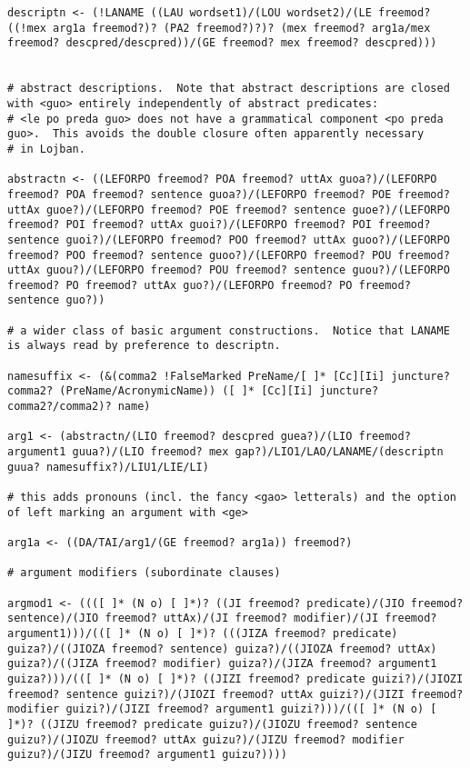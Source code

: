 \documentclass{article}
\begin{document}
\begin{verbatim}
descriptn <- (!LANAME ((LAU wordset1)/(LOU wordset2)/(LE freemod? ((!mex arg1a freemod?)? (PA2 freemod?)?)? (mex freemod? arg1a/mex freemod? descpred/descpred))/(GE freemod? mex freemod? descpred)))


# abstract descriptions.  Note that abstract descriptions are closed with <guo> entirely independently of abstract predicates:
# <le po preda guo> does not have a grammatical component <po preda guo>.  This avoids the double closure often apparently necessary
# in Lojban.

abstractn <- ((LEFORPO freemod? POA freemod? uttAx guoa?)/(LEFORPO freemod? POA freemod? sentence guoa?)/(LEFORPO freemod? POE freemod? uttAx guoe?)/(LEFORPO freemod? POE freemod? sentence guoe?)/(LEFORPO freemod? POI freemod? uttAx guoi?)/(LEFORPO freemod? POI freemod? sentence guoi?)/(LEFORPO freemod? POO freemod? uttAx guoo?)/(LEFORPO freemod? POO freemod? sentence guoo?)/(LEFORPO freemod? POU freemod? uttAx guou?)/(LEFORPO freemod? POU freemod? sentence guou?)/(LEFORPO freemod? PO freemod? uttAx guo?)/(LEFORPO freemod? PO freemod? sentence guo?))

# a wider class of basic argument constructions.  Notice that LANAME is always read by preference to descriptn.

namesuffix <- (&(comma2 !FalseMarked PreName/[ ]* [Cc][Ii] juncture? comma2? (PreName/AcronymicName)) ([ ]* [Cc][Ii] juncture? comma2?/comma2)? name)

arg1 <- (abstractn/(LIO freemod? descpred guea?)/(LIO freemod? argument1 guua?)/(LIO freemod? mex gap?)/LIO1/LAO/LANAME/(descriptn guua? namesuffix?)/LIU1/LIE/LI)

# this adds pronouns (incl. the fancy <gao> letterals) and the option of left marking an argument with <ge>

arg1a <- ((DA/TAI/arg1/(GE freemod? arg1a)) freemod?)

# argument modifiers (subordinate clauses)

argmod1 <- ((([ ]* (N o) [ ]*)? ((JI freemod? predicate)/(JIO freemod? sentence)/(JIO freemod? uttAx)/(JI freemod? modifier)/(JI freemod? argument1)))/(([ ]* (N o) [ ]*)? (((JIZA freemod? predicate) guiza?)/((JIOZA freemod? sentence) guiza?)/((JIOZA freemod? uttAx) guiza?)/((JIZA freemod? modifier) guiza?)/(JIZA freemod? argument1 guiza?)))/(([ ]* (N o) [ ]*)? ((JIZI freemod? predicate guizi?)/(JIOZI freemod? sentence guizi?)/(JIOZI freemod? uttAx guizi?)/(JIZI freemod? modifier guizi?)/(JIZI freemod? argument1 guizi?)))/(([ ]* (N o) [ ]*)? ((JIZU freemod? predicate guizu?)/(JIOZU freemod? sentence guizu?)/(JIOZU freemod? uttAx guizu?)/(JIZU freemod? modifier guizu?)/(JIZU freemod? argument1 guizu?))))


\end{verbatim}
\end{document}

